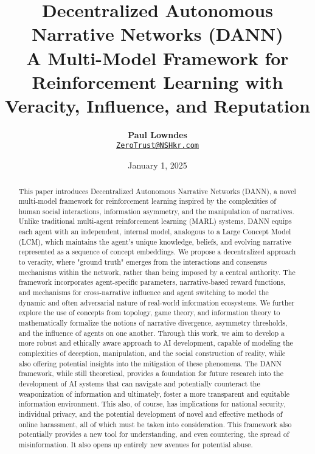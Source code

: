 \documentclass[12pt, a4paper]{article}
\title{\vspace{-2cm}\textbf{Decentralized Autonomous Narrative Networks (DANN) \\ A Multi-Model Framework for Reinforcement Learning with Veracity, Influence, and Reputation}}
\author{\textbf{Paul Lowndes} \\ \href{mailto:ZeroTrust@NSHkr.com}{\texttt{ZeroTrust@NSHkr.com}}}
\date{\small January 1, 2025}
\begin{document}
\maketitle
\vspace{-1.5em}

\begin{abstract}
This paper introduces Decentralized Autonomous Narrative Networks (DANN), a novel multi-model framework for reinforcement learning inspired by the complexities of human social interactions, information asymmetry, and the manipulation of narratives. Unlike traditional multi-agent reinforcement learning (MARL) systems, DANN equips each agent with an independent, internal model, analogous to a Large Concept Model (LCM), which maintains the agent's unique knowledge, beliefs, and evolving narrative represented as a sequence of concept embeddings. We propose a decentralized approach to veracity, where "ground truth" emerges from the interactions and consensus mechanisms within the network, rather than being imposed by a central authority. The framework incorporates agent-specific parameters, narrative-based reward functions, and mechanisms for cross-narrative influence and agent switching to model the dynamic and often adversarial nature of real-world information ecosystems. We further explore the use of concepts from topology, game theory, and information theory to mathematically formalize the notions of narrative divergence, asymmetry thresholds, and the influence of agents on one another. Through this work, we aim to develop a more robust and ethically aware approach to AI development, capable of modeling the complexities of deception, manipulation, and the social construction of reality, while also offering potential insights into the mitigation of these phenomena. The DANN framework, while still theoretical, provides a foundation for future research into the development of AI systems that can navigate and potentially counteract the weaponization of information and ultimately, foster a more transparent and equitable information environment. This also, of course, has implications for national security, individual privacy, and the potential development of novel and effective methods of online harassment, all of which must be taken into consideration. This framework also potentially provides a new tool for understanding, and even countering, the spread of misinformation. It also opens up entirely new avenues for potential abuse.
\end{abstract}
\end{document}
